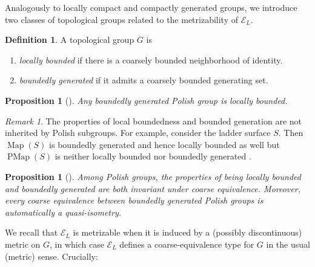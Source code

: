 \documentclass[twoside]{amsart}
\theoremstyle{plain}
\newtheorem{lemma}[theorem]{Lemma}
\newtheorem{proposition}[theorem]{Proposition}
\theoremstyle{break}
\theoremstyle{definition}
\newtheorem{definition}[theorem]{Definition}
\theoremstyle{remark}
\newtheorem{remark*}[theorem]{Remark}
\DeclareMathOperator{\Map}{Map}
\DeclareMathOperator{\PMap}{PMap}
\begin{document}


Analogously to locally compact and compactly generated groups, we
introduce two classes of topological groups related to
the metrizability of $\mathcal{E}_L$.

\begin{definition} A topological group $G$ is
  \begin{enumerate}[label=(\roman*)]
      \item \textit{locally bounded} if there is a coarsely bounded
        neighborhood of identity.
    \item \textit{boundedly generated} if 
    it admits a coarsely bounded generating set.
    \end{enumerate}
\end{definition}
\begin{proposition}[{\cite[Thm.~2.40]{rosendal}}]\label{prop:gentoloc}
  Any boundedly generated Polish group is locally bounded.
\end{proposition}

\begin{remark*}\label{rem:lb_non_inheritence}
    The properties of local boundedness 
    and bounded generation are not inherited by 
    Polish subgroups. For example, consider the ladder
    surface $S$. Then $\Map(S)$ is boundedly generated 
    and hence locally bounded as well {\cite{mannrafi}} 
    but $\PMap(S)$ is neither locally bounded nor 
    boundedly generated {\cite{hill}}.
\end{remark*}

\begin{proposition}[{\cite[Cor.~3.26]{rosendal}}]
    Among Polish groups, the properties of being locally bounded  
    and boundedly generated are both invariant under coarse equivalence. 
    Moreover, every coarse equivalence between boundedly 
    generated Polish groups is automatically a quasi-isometry.
\end{proposition}

We recall that
$\mathcal{E}_L$ is metrizable when it is induced by
a  (possibly discontinuous) 
metric on $G$, in which case $\mathcal{E}_L$ defines a
 coarse-equivalence type for $G$ in the usual (metric) sense.  
 Crucially: 
\end{document}

